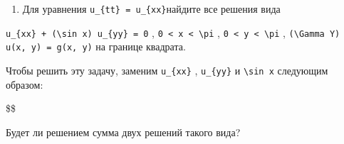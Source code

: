 \documentclass[
  ukrainian,
]{article}
\providecommand{\tightlist}{%
  \setlength{\itemsep}{0pt}\setlength{\parskip}{0pt}}
\begin{document}
\begin{enumerate}
\def\labelenumi{\arabic{enumi}.}
\setcounter{enumi}{3}
\tightlist
\item
  Для уравнения \texttt{u\_\{tt\}\ =\ u\_\{xx\}}найдите все решения вида
\end{enumerate}

\texttt{u\_\{xx\}\ +\ (\textbackslash{}sin\ x)\ u\_\{yy\}\ =\ 0} ,
\texttt{0\ \textless{}\ x\ \textless{}\ \textbackslash{}pi} ,
\texttt{0\ \textless{}\ y\ \textless{}\ \textbackslash{}pi} ,
\texttt{(\textbackslash{}Gamma\ Y)} \texttt{u(x,\ y)\ =\ g(x,\ y)} на
границе квадрата.

Чтобы решить эту задачу, заменим \texttt{u\_\{xx\}} , \texttt{u\_\{yy\}}
и \texttt{\textbackslash{}sin\ x} следующим образом:

\$\$

Будет ли решением сумма двух решений такого вида?
\end{document}
